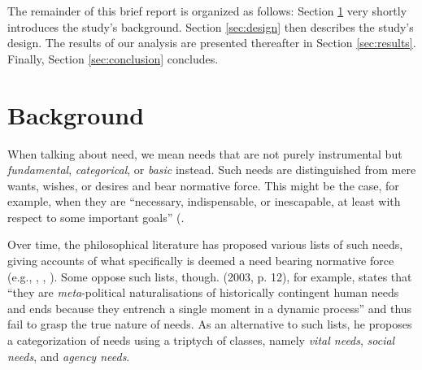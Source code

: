 \documentclass[egregdoesnotlikesansseriftitles]{scrartcl}
\begin{document}
The remainder of this brief report is organized as follows:
Section \ref{sec:literature} very shortly introduces the study's background.
Section \ref{sec:design} then describes the study's design.
The results of our analysis are presented thereafter in Section \ref{sec:results}.
Finally, Section \ref{sec:conclusion} concludes.


\section{Background}\label{sec:literature}
When talking about need, we mean needs that are not purely instrumental but \textit{fundamental}, \textit{categorical}, or \textit{basic} instead.
Such needs are distinguished from mere wants, wishes, or desires and bear normative force.
This might be the case, for example, when they are ``necessary, indispensable, or inescapable, at least with respect to some important goals'' (\citealt[par. 37)]{brock_needs_2019}.

Over time, the philosophical literature has proposed various lists of such needs, giving accounts of what specifically is deemed a need bearing normative force (e.g., \citealt{doyal_theory_1991}, \citealt{braybrooke_meeting_1987}, \citealt{nussbaum_aristotelian_1990}).
Some oppose such lists, though.
\citeauthor{hamilton_political_2003} (2003, p. 12), for example, states that ``they are \textit{meta}-political naturalisations of historically contingent human needs and ends because they entrench a single moment in a dynamic process'' and thus fail to grasp the true nature of needs.
As an alternative to such lists, he proposes a categorization of needs using a triptych of classes, namely \textit{vital needs}, \textit{social needs}, and \textit{agency needs}.
\end{document}

